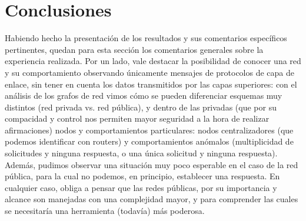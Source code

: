 \section{Conclusiones}

Habiendo hecho la presentación de los resultados y sus comentarios específicos pertinentes, quedan para esta sección los comentarios generales sobre la experiencia realizada. Por un lado, vale destacar la posibilidad de conocer una red y su comportamiento observando únicamente mensajes de protocolos de capa de enlace, sin tener en cuenta los datos transmitidos por las capas superiores: con el análisis de los grafos de red vimos cómo se pueden diferenciar esquemas muy distintos (red privada vs. red pública), y dentro de las privadas (que por su compacidad y control nos permiten mayor seguridad a la hora de realizar afirmaciones) nodos y comportamientos particulares: nodos centralizadores (que podemos identificar con routers) y comportamientos anómalos (multiplicidad de solicitudes y ninguna respuesta, o una única solicitud y ninguna respuesta). Además, pudimos observar una situación muy poco esperable en el caso de la red pública, para la cual no podemos, en principio, establecer una respuesta.
En cualquier caso, obliga a pensar que las redes públicas, por su importancia y alcance son manejadas con una complejidad mayor, y para comprender las cuales se necesitaría una herramienta (todavía) más poderosa.

